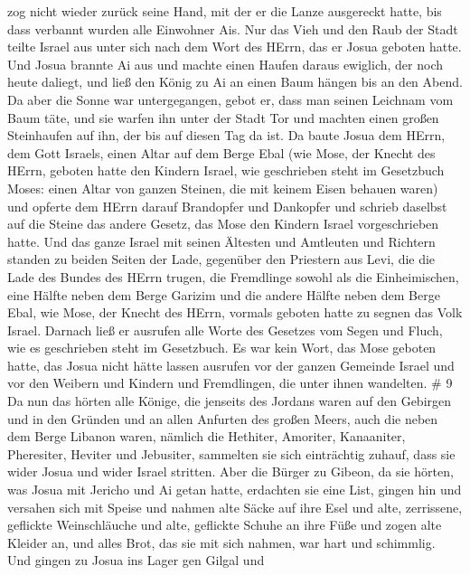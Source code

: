 zog nicht wieder zurück seine Hand, mit der er die Lanze ausgereckt
hatte, bis dass verbannt wurden alle Einwohner Ais.  Nur
das Vieh und den Raub der Stadt teilte Israel aus unter sich nach dem
Wort des HErrn, das er Josua geboten hatte.  Und Josua
brannte Ai aus und machte einen Haufen daraus ewiglich, der noch heute
daliegt,  und ließ den König zu Ai an einen Baum hängen bis
an den Abend. Da aber die Sonne war untergegangen, gebot er, dass man
seinen Leichnam vom Baum täte, und sie warfen ihn unter der Stadt Tor
und machten einen großen Steinhaufen auf ihn, der bis auf diesen Tag da
ist.  Da baute Josua dem HErrn, dem Gott Israels, einen
Altar auf dem Berge Ebal  (wie Mose, der Knecht des HErrn,
geboten hatte den Kindern Israel, wie geschrieben steht im Gesetzbuch
Moses: einen Altar von ganzen Steinen, die mit keinem Eisen behauen
waren) und opferte dem HErrn darauf Brandopfer und Dankopfer
 und schrieb daselbst auf die Steine das andere Gesetz, das
Mose den Kindern Israel vorgeschrieben hatte.  Und das
ganze Israel mit seinen Ältesten und Amtleuten und Richtern standen zu
beiden Seiten der Lade, gegenüber den Priestern aus Levi, die die Lade
des Bundes des HErrn trugen, die Fremdlinge sowohl als die
Einheimischen, eine Hälfte neben dem Berge Garizim und die andere Hälfte
neben dem Berge Ebal, wie Mose, der Knecht des HErrn, vormals geboten
hatte zu segnen das Volk Israel.  Darnach ließ er ausrufen
alle Worte des Gesetzes vom Segen und Fluch, wie es geschrieben steht im
Gesetzbuch.  Es war kein Wort, das Mose geboten hatte, das
Josua nicht hätte lassen ausrufen vor der ganzen Gemeinde Israel und vor
den Weibern und Kindern und Fremdlingen, die unter ihnen wandelten. \# 9
 Da nun das hörten alle Könige, die jenseits des Jordans
waren auf den Gebirgen und in den Gründen und an allen Anfurten des
großen Meers, auch die neben dem Berge Libanon waren, nämlich die
Hethiter, Amoriter, Kanaaniter, Pheresiter, Heviter und Jebusiter,
 sammelten sie sich einträchtig zuhauf, dass sie wider Josua
und wider Israel stritten.  Aber die Bürger zu Gibeon, da
sie hörten, was Josua mit Jericho und Ai getan hatte, erdachten sie eine
List,  gingen hin und versahen sich mit Speise und nahmen
alte Säcke auf ihre Esel  und alte, zerrissene, geflickte
Weinschläuche und alte, geflickte Schuhe an ihre Füße und zogen alte
Kleider an, und alles Brot, das sie mit sich nahmen, war hart und
schimmlig.  Und gingen zu Josua ins Lager gen Gilgal und
